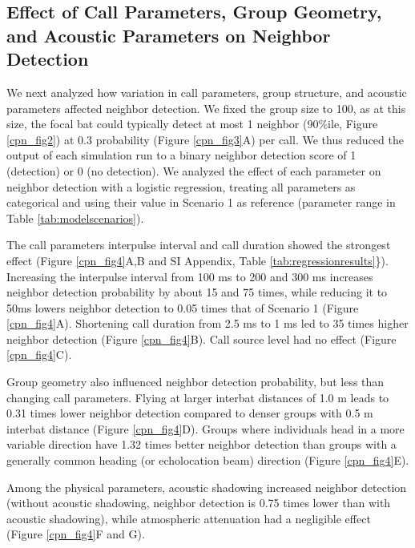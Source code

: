 \documentclass[
]{book}
\begin{document}
\hypertarget{effect-of-call-parameters-group-geometry-and-acoustic-parameters-on-neighbor-detection}{%
\subsection{Effect of Call Parameters, Group Geometry, and Acoustic Parameters on Neighbor Detection}\label{effect-of-call-parameters-group-geometry-and-acoustic-parameters-on-neighbor-detection}}

We next analyzed how variation in call parameters, group structure, and acoustic parameters affected neighbor detection. We fixed the group size to 100, as at this size, the focal bat could typically detect at most 1 neighbor (90\%ile, Figure \ref{cpn_fig2}) at 0.3 probability (Figure \ref{cpn_fig3}A) per call. We thus reduced the output of each simulation run to a binary neighbor detection score of 1 (detection) or 0 (no detection). We analyzed the effect of each parameter on neighbor detection with a logistic regression, treating all parameters as categorical and using their value in Scenario 1 as reference (parameter range in Table \ref{tab:modelscenarios}).

The call parameters interpulse interval and call duration showed the strongest effect (Figure \ref{cpn_fig4}A,B and SI Appendix, Table \ref{tab:regressionresults}\}). Increasing the interpulse interval from 100 ms to 200 and 300 ms increases neighbor detection probability by about 15 and 75 times, while reducing it to 50ms lowers neighbor detection to 0.05 times that of Scenario 1 (Figure \ref{cpn_fig4}A). Shortening call duration from 2.5 ms to 1 ms led to 35 times higher neighbor detection (Figure \ref{cpn_fig4}B). Call source level had no effect (Figure \ref{cpn_fig4}C).

Group geometry also influenced neighbor detection probability, but less than changing call parameters. Flying at larger interbat distances of 1.0 m leads to 0.31 times lower neighbor detection compared to denser groups with 0.5 m interbat distance (Figure \ref{cpn_fig4}D). Groups where individuals head in a more variable direction have 1.32 times better neighbor detection than groups with a generally common heading (or echolocation beam) direction (Figure \ref{cpn_fig4}E).

Among the physical parameters, acoustic shadowing increased neighbor detection (without acoustic shadowing, neighbor detection is 0.75 times lower than with acoustic shadowing), while atmospheric attenuation had a negligible effect (Figure \ref{cpn_fig4}F and G).
\end{document}
